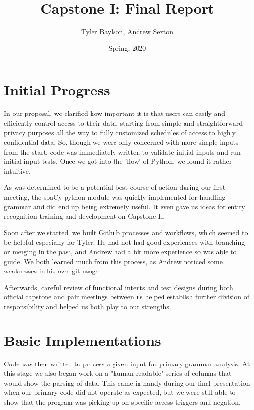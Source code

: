 \documentclass[12pt]{article}
\begin{document}

\title{Capstone I: Final Report}
\author{Tyler Baylson, Andrew Sexton}
\date{Spring, 2020}
\maketitle

\section{Initial Progress}
In our proposal, we clarified how important it is that users can easily and efficiently control access to their data, starting from simple and straightforward privacy purposes all the way to fully customized schedules of access to highly confidential data. So, though we were only concerned with more simple inputs from the start, code was immediately written to validate initial inputs and run initial input tests. Once we got into the 'flow' of Python, we found it rather intuitive. 

As was determined to be a potential best course of action during our first meeting, the spaCy python module was quickly implemented for handling grammar and did end up being extremely useful. It even gave us ideas for entity recognition training and development on Capstone II.

Soon after we started, we built Github processes and workflows, which seemed to be helpful especially for Tyler. He had not had good experiences with branching or merging in the past, and Andrew had a bit more experience so was able to guide. We both learned much from this process, as Andrew noticed some weaknesses in his own git usage. 

Afterwards, careful review of functional intents and test designs during both official capstone and pair meetings between us helped establish further division of responsibility and helped us both play to our strengths.

\section{Basic Implementations}
Code was then written to process a given input for primary grammar analysis. At this stage we also began work on a "human readable" series of columns that would show the parsing of data. This came in handy during our final presentation when our primary code did not operate as expected, but we were still able to show that the program was picking up on specific access triggers and negation.
\end{document}
